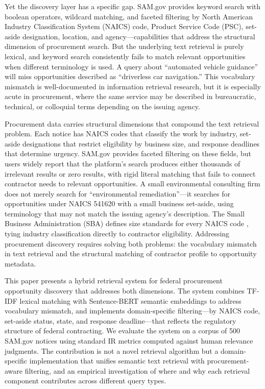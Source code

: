 \documentclass[10pt,twocolumn]{article}
\begin{document}
Yet the discovery layer has a specific gap. SAM.gov provides keyword search with boolean operators, wildcard matching, and faceted filtering by North American Industry Classification System (NAICS) code, Product Service Code (PSC), set-aside designation, location, and agency---capabilities that address the structural dimension of procurement search. But the underlying text retrieval is purely lexical, and keyword search consistently fails to match relevant opportunities when different terminology is used. A query about ``automated vehicle guidance'' will miss opportunities described as ``driverless car navigation.'' This vocabulary mismatch is well-documented in information retrieval research, but it is especially acute in procurement, where the same service may be described in bureaucratic, technical, or colloquial terms depending on the issuing agency.

Procurement data carries structural dimensions that compound the text retrieval problem. Each notice has NAICS codes that classify the work by industry, set-aside designations that restrict eligibility by business size, and response deadlines that determine urgency. SAM.gov provides faceted filtering on these fields, but users widely report that the platform's search produces either thousands of irrelevant results or zero results, with rigid literal matching that fails to connect contractor needs to relevant opportunities. A small environmental consulting firm does not merely search for ``environmental remediation''---it searches for opportunities under NAICS 541620 with a small business set-aside, using terminology that may not match the issuing agency's description. The Small Business Administration (SBA) defines size standards for every NAICS code \cite{SBA2024}, tying industry classification directly to contractor eligibility. Addressing procurement discovery requires solving both problems: the vocabulary mismatch in text retrieval and the structural matching of contractor profile to opportunity metadata.

This paper presents a hybrid retrieval system for federal procurement opportunity discovery that addresses both dimensions. The system combines TF-IDF lexical matching with Sentence-BERT semantic embeddings to address vocabulary mismatch, and implements domain-specific filtering---by NAICS code, set-aside status, state, and response deadline---that reflects the regulatory structure of federal contracting. We evaluate the system on a corpus of 500 SAM.gov notices using standard IR metrics computed against human relevance judgments. The contribution is not a novel retrieval algorithm but a domain-specific implementation that unifies semantic text retrieval with procurement-aware filtering, and an empirical investigation of where and why each retrieval component contributes across different query types.
\end{document}
